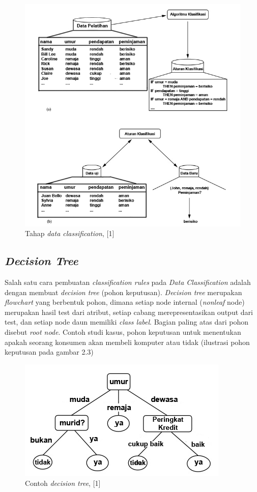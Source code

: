 \begin{figure}
\includegraphics[scale=1]{Gambar/tahapdataclassification.jpg}
\caption[Tahap \textsl{data classification}]{Tahap \textsl{data classification}, [1]} 
\end{figure}

\subsection{\textsl{Decision Tree}}
Salah satu cara pembuatan \textsl{classification rules} pada \textsl{Data Classification} adalah dengan membuat \textsl{decision tree} (pohon keputusan). \textsl{Decision tree} merupakan \textsl{flowchart} yang berbentuk pohon, dimana setiap node internal (\textsl{nonleaf} node) merupakan hasil test dari atribut, setiap cabang merepresentasikan output dari test, dan setiap node daun memiliki \textsl{class label}. Bagian paling atas dari pohon disebut \textsl{root node}. Contoh studi kasus, pohon keputusan untuk menentukan apakah seorang konsumen akan membeli komputer atau tidak (ilustrasi pohon keputusan pada gambar 2.3) 

\begin{figure}
\includegraphics[scale=1]{Gambar/decisiontree.jpg}
\caption[Contoh \textsl{decision tree}]{Contoh \textsl{decision tree}, [1]} 
\end{figure}

